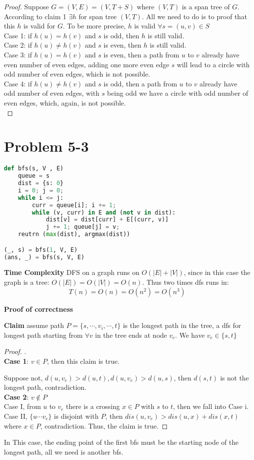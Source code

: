 \documentclass{article}
\begin{document}
\begin{proof}
	Suppose $G = (V, E) = (V, T + S)$ where $(V, T)$ is a span tree of $G$. According to claim 1 $\exists h$ for span tree $(V, T)$. All we need to do is to proof that this $h$ is valid for $G$. To be more precise, $h$ is valid $\forall s = (u, v) \in S$\\
	Case 1: if $h(u) = h(v)$ and $s$ is odd, then $h$ is still valid. \\
	Case 2: if $h(u) \neq h(v)$ and $s$ is even, then $h$ is still valid. \\
	Case 3: if $h(u) = h(v)$ and $s$ is even, then a path from $u$ to $v$ already have even number of even edges, adding one more even edge $s$ will lead to a circle with odd number of even edges, which is not possible. \\
	Case 4: if $h(u) \neq h(v)$ and $s$ is odd, then a path from $u$ to $v$ already have odd number of even edges, with $s$ being odd we have a circle with odd number of even edges, which, again, is not possible. \\

\end{proof}
\section*{Problem 5-3}
\begin{lstlisting}[language = python]
def bfs(s, V , E)
    queue = s
    dist = {s: 0}
    i = 0; j = 0;
    while i <= j:
        curr = queue[i]; i += 1;
        while (v, curr) in E and (not v in dist):
            dist[v] = dist[curr] + E[(curr, v)]
            j += 1; queue[j] = v;
    reutrn (max(dist), argmax(dist))

(_, s) = bfs(1, V, E)
(ans, _) = bfs(s, V, E)
\end{lstlisting}
\par \textbf{Time Complexity} DFS on a graph runs on $O(|E| + |V|)$, since in this case the graph is a tree: $O(|E|) = O(|V|) = O(n)$. Thus two times dfs runs in:
$$T(n) = O(n) = O(n^2) = O(n^3)$$
\par \textbf{Proof of correctness} 
\par \textbf{Claim} assume path $ P = \{s, \cdots, v_i, \cdots, t\}$ is the longest path in the tree, a dfs for longest path starting from $\forall v$ in the tree ends at node $v_e$. We have $v_e \in \{s, t\}$
\begin{proof}. \\
    \textbf{Case 1}: $v \in P$, then this claim is true. 
    \par Suppose not, $d(u, v_e) > d(u, t), d(u, v_e) > d(u, s)$, then $d(s, t)$ is not the longest path, contradiction. \\
    \textbf{Case 2}: $v \notin P$ \\
    	Case I, from $u$ to $v_e$ there is a crossing $x \in P$ with $s$ to $t$, then we fall into Case i.
    	Case II, $\{u \cdots v_e \}$ is disjoint with $P$, then $dis(u, v_e) > dis(u, x) + dis(x, t)$ where $x \in P$, contradiction.
    Thus, the claim is true.
\end{proof}
In This case, the ending point of the first bfs must be the starting node of the longest path, all we need is another bfs.
\end{document}
